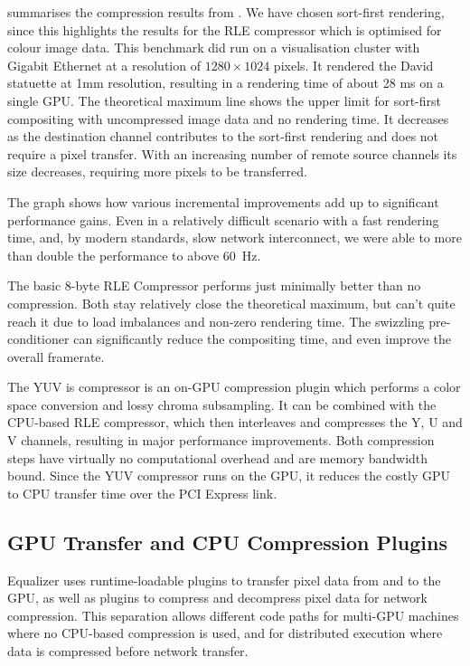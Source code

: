  summarises the compression results from \cite{MEP:10}. We have
chosen sort-first rendering, since this highlights the results for the RLE
compressor which is optimised for colour image data. This benchmark did run on a
visualisation cluster with Gigabit Ethernet at a resolution of $1280\times
1024$ pixels. It rendered the David statuette at 1mm resolution, resulting
in a rendering time of about 28 ms on a single GPU. The theoretical maximum
line shows the upper limit for sort-first compositing with uncompressed image
data and no rendering time. It decreases as the destination channel
contributes to the sort-first rendering and does not require a pixel transfer.
With an increasing number of remote source channels its size decreases,
requiring more pixels to be transferred.

The graph shows how various incremental improvements add up to significant
performance gains. Even in a relatively difficult scenario with a fast
rendering time, and, by modern standards, slow network interconnect, we were
able to more than double the performance to above 60~Hz.

The basic 8-byte RLE Compressor performs just minimally better than no
compression. Both stay relatively close the theoretical maximum, but can't
quite reach it due to load imbalances and non-zero rendering time. The
swizzling pre-conditioner can significantly reduce the compositing time, and
even improve the overall framerate.

The YUV is compressor is an on-GPU compression plugin which performs a
color space conversion and lossy chroma subsampling. It can be combined with the
CPU-based RLE compressor, which then interleaves and compresses the Y, U and V
channels, resulting in major performance improvements. Both compression steps
have virtually no computational overhead and are memory bandwidth bound. Since
the YUV compressor runs on the GPU, it reduces the costly GPU to CPU transfer
time over the PCI Express link.

\subsection{GPU Transfer and CPU Compression Plugins}

Equalizer uses runtime-loadable plugins to transfer pixel data from and to the
GPU, as well as plugins to compress and decompress pixel data for network
compression. This separation allows different code paths for multi-GPU machines
where no CPU-based compression is used, and for distributed execution where data
is compressed before network transfer.

